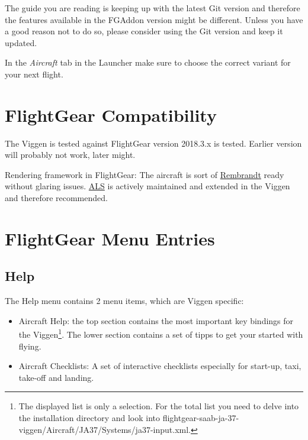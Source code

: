 The guide you are reading is keeping up with the latest Git version and therefore the features available in the FGAddon version might be different. Unless you have a good reason not to do so, please consider using the Git version and keep it updated.

In the \emph{Aircraft} tab in the Launcher make sure to choose the correct variant for your next flight.

\chapter{FlightGear Compatibility}
The Viggen is tested against FlightGear version 2018.3.x is tested. Earlier version will probably not work, later might.

Rendering framework in FlightGear: The aircraft is sort of \href{http://wiki.flightgear.org/Project_Rembrandt}{Rembrandt} ready without glaring issues. \href{http://wiki.flightgear.org/Atmospheric_light_scattering}{ALS} is actively maintained and extended in the Viggen and therefore recommended.

\chapter{FlightGear Menu Entries}
\section{Help}
The Help menu contains 2 menu items, which are Viggen specific:
\begin{itemize}
\item Aircraft Help: the top section contains the most important key bindings for the Viggen\footnote{The displayed list is only a selection. For the total list you need to delve into the installation directory and look into flightgear-saab-ja-37-viggen/Aircraft/JA37/Systems/ja37-input.xml.}. The lower section contains a set of tipps to get your started with flying.
\item Aircraft Checklists: A set of interactive checklists especially for start-up, taxi, take-off and landing.
\end{itemize}

